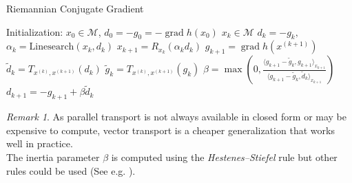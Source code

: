 \documentclass[10pt,a4paper]{book}
\theoremstyle{definition}
\theoremstyle{plain}
\theoremstyle{remark}
\newtheorem{rmk}{Remark}[section]
\begin{document}
\begin{algorithm}
\caption{Riemannian Conjugate Gradient}
\begin{algorithmic}[1]
\Require Initialization: $x_0 \in \mathcal{M}$, $d_0 = -g_0=-\operatorname{grad} h(x_0)$
\Ensure $x_k \in \mathcal{M}$
        \State $d_k =-g_k,$
    \EndIf
    \State $\alpha_k = \text{Linesearch}(x_k, d_k)$
    \State $x_{k+1} = R_{x_k}(\alpha_k d_k)$
    \State $g_{k+1} = \operatorname{grad} h(x^{(k+1)})$
    \State $\tilde{d}_{k} = T_{x^{(k)}, x^{(k+1)}}(d_k)$
    \State $\tilde{g}_{k} = T_{x^{(k)}, x^{(k+1)}}(g_k)$
    \State $\beta = \max \left(0, \frac{\langle g_{k+1} - \tilde{g}_k, g_{k+1} \rangle_{x_{k+1}}}{\langle g_{k+1} - \tilde{g}_k, \tilde{d}_k \rangle_{x_{k+1}}} \right)$
    \State $d_{k+1} = -g_{k+1} + \beta \tilde{d}_k$
\EndFor
\end{algorithmic}
\end{algorithm}
\begin{rmk}
As parallel transport is not always available in closed form or may be expensive to compute, vector transport is a cheaper generalization that works well in practice. \\ The inertia parameter $\beta$ is computed using the \emph{Hestenes--Stiefel} rule but other rules could be used (See e.g. \cite{hager2006survey}). 
\end{rmk}

\end{document}
